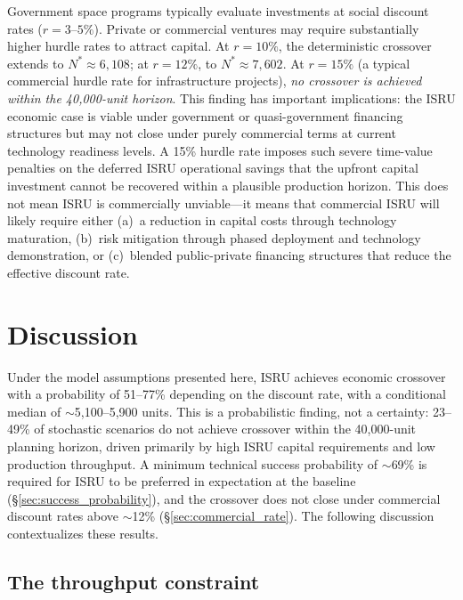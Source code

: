 \documentclass[preprint,12pt]{elsarticle}
\begin{document}
Government space programs typically evaluate investments at social discount rates ($r = 3$--$5\%$). Private or commercial ventures may require substantially higher hurdle rates to attract capital. At $r = 10\%$, the deterministic crossover extends to $N^* \approx 6{,}108$; at $r = 12\%$, to $N^* \approx 7{,}602$. At $r = 15\%$ (a typical commercial hurdle rate for infrastructure projects), \emph{no crossover is achieved within the 40{,}000-unit horizon}. This finding has important implications: the ISRU economic case is viable under government or quasi-government financing structures but may not close under purely commercial terms at current technology readiness levels. A 15\% hurdle rate imposes such severe time-value penalties on the deferred ISRU operational savings that the upfront capital investment cannot be recovered within a plausible production horizon. This does not mean ISRU is commercially unviable---it means that commercial ISRU will likely require either (a)~a reduction in capital costs through technology maturation, (b)~risk mitigation through phased deployment and technology demonstration, or (c)~blended public-private financing structures that reduce the effective discount rate.

\section{Discussion}
\label{sec:discussion}

Under the model assumptions presented here, ISRU achieves economic crossover with a probability of 51--77\% depending on the discount rate, with a conditional median of $\sim$5{,}100--5{,}900 units. This is a probabilistic finding, not a certainty: 23--49\% of stochastic scenarios do not achieve crossover within the 40{,}000-unit planning horizon, driven primarily by high ISRU capital requirements and low production throughput. A minimum technical success probability of $\sim$69\% is required for ISRU to be preferred in expectation at the baseline (\S\ref{sec:success_probability}), and the crossover does not close under commercial discount rates above $\sim$12\% (\S\ref{sec:commercial_rate}). The following discussion contextualizes these results.

\subsection{The throughput constraint}
\label{sec:throughput}
\end{document}
